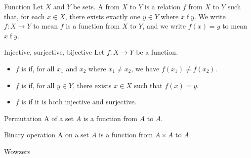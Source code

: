 \begin{dfnbox}{Function}{}
    Let $X$ and $Y$ be sets. A  from $X$ to $Y$ is a relation $f$ from $X$ to $Y$ such that, for each $x \in X$, there exists exactly one $y \in Y$ where $x \mathrel{f} y$. We write $f : X \to Y$ to mean $f$ is a function from $X$ to $Y$, and we write $f(x) = y$ to mean $x \mathrel{f} y$.
\end{dfnbox}

\begin{dfnbox}{Injective, surjective, bijective}{}
    Let $f : X \to Y$ be a function.
    \begin{itemize}
        \item $f$ is  if, for all $x_1$ and $x_2$ where $x_1 \neq x_2$, we have $f(x_1) \neq f(x_2)$.
        \item $f$ is  if, for all $y \in Y$, there exists $x \in X$ such that $f(x) = y$.
        \item $f$ is  if it is both injective and surjective.
    \end{itemize}
\end{dfnbox}

\begin{dfnbox}{Permutation}{}
    A  of a set $A$ is a function from $A$ to $A$.
\end{dfnbox}

\begin{dfnbox}{Binary operation}{}
    A  on a set $A$ is a function from $A \times A$ to $A$.
\end{dfnbox}

Wowzers
